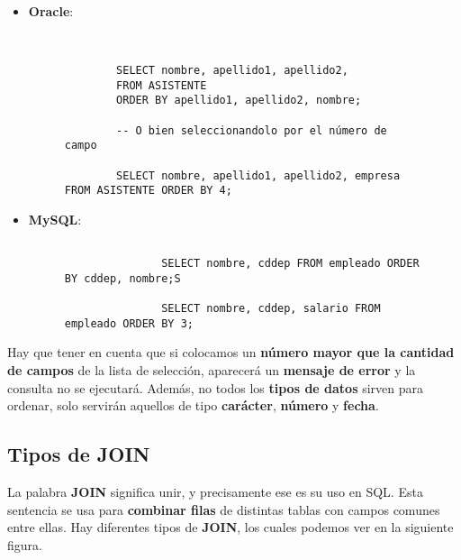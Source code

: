 \begin{itemize}
    \item \textbf{Oracle}:

    \begin{figure}[H]
        \begin{tcolorbox}[sharp corners, colback=yellow!30, colframe=white!20]
            \scriptsize
            \begin{verbatim}


        SELECT nombre, apellido1, apellido2,
        FROM ASISTENTE
        ORDER BY apellido1, apellido2, nombre;

        -- O bien seleccionandolo por el número de campo

        SELECT nombre, apellido1, apellido2, empresa FROM ASISTENTE ORDER BY 4;
            \end{verbatim}
        \end{tcolorbox}
    \end{figure}

    \item \textbf{MySQL}:

    \begin{figure}[H]
        \begin{tcolorbox}[sharp corners, colback=yellow!30, colframe=white!20]
            \scriptsize
            \begin{verbatim}

               SELECT nombre, cddep FROM empleado ORDER BY cddep, nombre;S

               SELECT nombre, cddep, salario FROM empleado ORDER BY 3;
            \end{verbatim}
        \end{tcolorbox}
    \end{figure}
\end{itemize}

Hay que tener en cuenta que si colocamos un \textbf{número mayor que la cantidad de campos} de la lista de selección, aparecerá un \textbf{mensaje de error} y la consulta no se ejecutará. Además, no todos los \textbf{tipos de datos}  sirven para ordenar, solo servirán aquellos de tipo \textbf{carácter}, \textbf{número} y \textbf{fecha}.

\subsection{Tipos de JOIN}
La palabra \textbf{JOIN} significa unir, y precisamente ese es su uso en SQL. Esta sentencia se usa para \textbf{combinar filas} de distintas tablas con campos comunes entre ellas. Hay diferentes tipos de \textbf{JOIN}, los cuales podemos ver en la siguiente figura.

